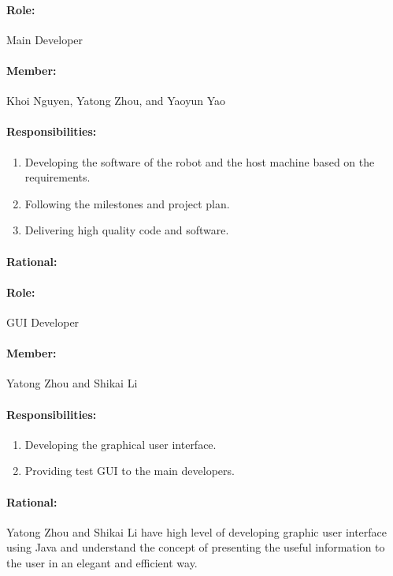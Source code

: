 \documentclass[11pt, a4paper]{report}
\begin{document}
\paragraph{Role: } Main Developer
\paragraph{Member: } Khoi Nguyen, Yatong Zhou, and Yaoyun Yao
\paragraph{Responsibilities: }
\begin{enumerate}
	\item  Developing the software of the robot and the host machine based on the requirements.
	\item  Following the milestones and project plan. 
	\item  Delivering high quality code and software.
\end{enumerate}
\paragraph{Rational: \\}


\paragraph{Role: } GUI Developer
\paragraph{Member: } Yatong Zhou and Shikai Li
\paragraph{Responsibilities: }
\begin{enumerate}
	\item  Developing the graphical user interface.
	\item  Providing test GUI to the main developers.
\end{enumerate}
\paragraph{Rational: \\}
Yatong Zhou and Shikai Li have high level of developing graphic user interface using Java and understand the concept of presenting the useful information to the user in an elegant and efficient way.
\end{document}
